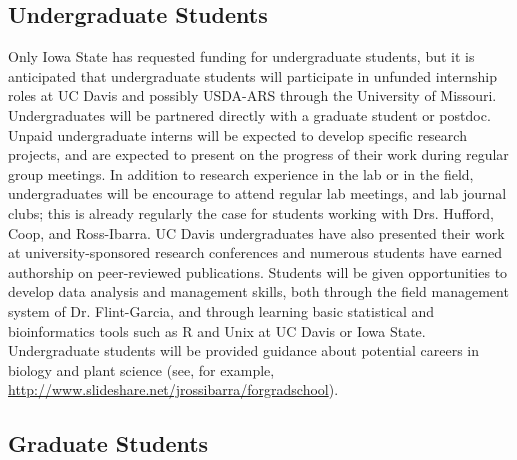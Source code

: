 \renewcommand{\thepage}{Plans for Undergraduate and Graduate Student Mentoring  - Page \arabic{page} of 1}

\subsection*{Undergraduate Students}

Only Iowa State has requested funding for undergraduate students, but it is anticipated that undergraduate students will participate in unfunded internship roles at UC Davis and possibly USDA-ARS through the University of Missouri. Undergraduates will  be partnered directly with a graduate student or postdoc. Unpaid undergraduate interns will be expected to develop specific research projects, and are expected to present on the progress of their work during regular group meetings.
In addition to research experience in the lab or in the field, undergraduates will be encourage to attend regular lab meetings, and lab journal clubs; this is already regularly the case for students working with Drs. Hufford, Coop, and Ross-Ibarra.  UC Davis undergraduates have also presented their work at university-sponsored research conferences and numerous students have earned authorship on peer-reviewed publications.  Students will be given opportunities to develop data analysis and management skills, both through the field management system of Dr. Flint-Garcia, and through learning basic statistical and bioinformatics tools such as R and Unix at UC Davis or Iowa State. 
Undergraduate students will be provided guidance about potential careers in biology and plant science (see, for example, \url{http://www.slideshare.net/jrossibarra/forgradschool}).  

\subsection*{Graduate Students}

